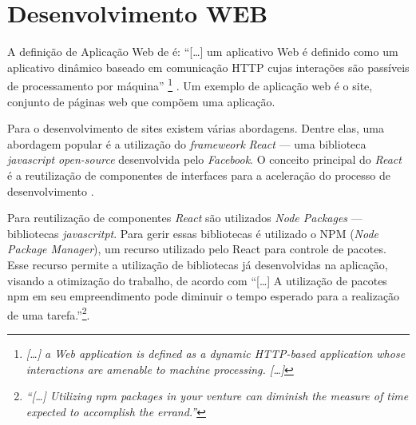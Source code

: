 \section {Desenvolvimento WEB}
\label{sec:desenvolvimentoWEB}

A definição de Aplicação Web de  é:
``[\dots] um aplicativo Web é definido como um aplicativo dinâmico baseado em comunicação HTTP cujas interações são passíveis de processamento por máquina'' \footnote{\textit{[\dots] a Web application is defined as a dynamic HTTP-based application whose
interactions are amenable to machine processing. [\dots]}} \cite[p.1, tradução nossa]{hadley2006web}. Um exemplo de aplicação web é o site, conjunto de páginas web que compõem uma aplicação.

Para o desenvolvimento de sites existem várias abordagens. Dentre elas, uma abordagem popular é a utilização do \textit{frameweork} \textit{React} — uma biblioteca \textit{javascript} \textit{open-source} desenvolvida pelo \textit{Facebook}. O conceito principal do \textit{React} é a reutilização de componentes de interfaces para a aceleração do processo de desenvolvimento \cite{rawat2020react}.

Para reutilização de componentes \textit{React} são utilizados \textit{Node Packages} — bibliotecas \textit{javascritpt}. Para gerir essas bibliotecas é utilizado o NPM (\textit{Node Package Manager}), um recurso utilizado pelo React para controle de pacotes. Esse recurso permite a utilização de bibliotecas já desenvolvidas na aplicação, visando a otimização do trabalho, de acordo com  ``[\dots] A utilização de pacotes npm em seu empreendimento pode diminuir o tempo esperado para a realização de uma tarefa.''\footnote{\textit{``[\dots] Utilizing npm packages in your venture can diminish the measure of time expected to accomplish the errand.''}}\cite[p.699, tradução nossa]{rawat2020react}.



